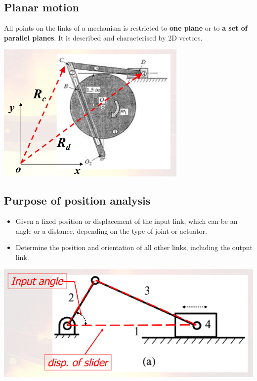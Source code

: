 \documentclass[11pt]{article}
\begin{document}
\subsection{Planar motion}
\label{sec:org11fbb37}
All points on the links of a mechanism is restricted to \textbf{one plane} or to \textbf{a set of parallel planes}. It is described and characterised by 2D vectors.
\begin{center}
\includegraphics[width=.9\linewidth]{./images/planar-motion.png}
\end{center}
\subsection{Purpose of position analysis}
\label{sec:org03f91a7}
\begin{itemize}
\item Given a fixed position or displacement of the input link, which can be an angle or a distance, depending on the type of joint or actuator.
\item Determine the position and orientation of all other links, including the output link.
\end{itemize}
\begin{center}
\includegraphics[width=.9\linewidth]{./images/position-analysis.png}
\end{center}
\end{document}
